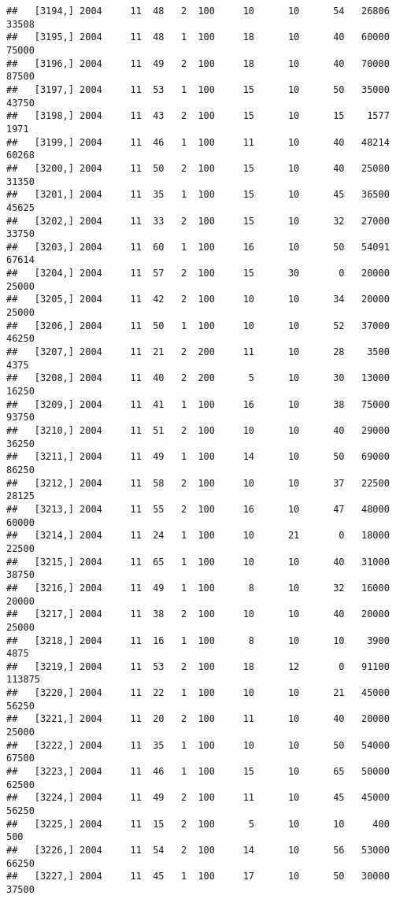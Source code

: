 \documentclass{article}\usepackage[]{graphicx}\usepackage[]{color}
\makeatletter
\newenvironment{kframe}{%
 \def\at@end@of@kframe{}%
 \ifinner\ifhmode%
  \def\at@end@of@kframe{\end{minipage}}%
  \begin{minipage}{\columnwidth}%
 \fi\fi%
 \def\FrameCommand##1{\hskip\@totalleftmargin \hskip-\fboxsep
 \colorbox{shadecolor}{##1}\hskip-\fboxsep
     \hskip-\linewidth \hskip-\@totalleftmargin \hskip\columnwidth}%
 \MakeFramed {\advance\hsize-\width
   \@totalleftmargin\z@ \linewidth\hsize
   \@setminipage}}%
 {\par\unskip\endMakeFramed%
 \at@end@of@kframe}
\newenvironment{knitrout}{}{} %
\makeatother
\begin{document}
\begin{knitrout}
\begin{kframe}
\begin{verbatim}
##   [3194,] 2004     11  48   2  100     10      10      54   26806   33508
##   [3195,] 2004     11  48   1  100     18      10      40   60000   75000
##   [3196,] 2004     11  49   2  100     18      10      40   70000   87500
##   [3197,] 2004     11  53   1  100     15      10      50   35000   43750
##   [3198,] 2004     11  43   2  100     15      10      15    1577    1971
##   [3199,] 2004     11  46   1  100     11      10      40   48214   60268
##   [3200,] 2004     11  50   2  100     15      10      40   25080   31350
##   [3201,] 2004     11  35   1  100     15      10      45   36500   45625
##   [3202,] 2004     11  33   2  100     15      10      32   27000   33750
##   [3203,] 2004     11  60   1  100     16      10      50   54091   67614
##   [3204,] 2004     11  57   2  100     15      30       0   20000   25000
##   [3205,] 2004     11  42   2  100     10      10      34   20000   25000
##   [3206,] 2004     11  50   1  100     10      10      52   37000   46250
##   [3207,] 2004     11  21   2  200     11      10      28    3500    4375
##   [3208,] 2004     11  40   2  200      5      10      30   13000   16250
##   [3209,] 2004     11  41   1  100     16      10      38   75000   93750
##   [3210,] 2004     11  51   2  100     10      10      40   29000   36250
##   [3211,] 2004     11  49   1  100     14      10      50   69000   86250
##   [3212,] 2004     11  58   2  100     10      10      37   22500   28125
##   [3213,] 2004     11  55   2  100     16      10      47   48000   60000
##   [3214,] 2004     11  24   1  100     10      21       0   18000   22500
##   [3215,] 2004     11  65   1  100     10      10      40   31000   38750
##   [3216,] 2004     11  49   1  100      8      10      32   16000   20000
##   [3217,] 2004     11  38   2  100     10      10      40   20000   25000
##   [3218,] 2004     11  16   1  100      8      10      10    3900    4875
##   [3219,] 2004     11  53   2  100     18      12       0   91100  113875
##   [3220,] 2004     11  22   1  100     10      10      21   45000   56250
##   [3221,] 2004     11  20   2  100     11      10      40   20000   25000
##   [3222,] 2004     11  35   1  100     10      10      50   54000   67500
##   [3223,] 2004     11  46   1  100     15      10      65   50000   62500
##   [3224,] 2004     11  49   2  100     11      10      45   45000   56250
##   [3225,] 2004     11  15   2  100      5      10      10     400     500
##   [3226,] 2004     11  54   2  100     14      10      56   53000   66250
##   [3227,] 2004     11  45   1  100     17      10      50   30000   37500

\end{verbatim}
\end{kframe}
\end{knitrout}
\end{document}
